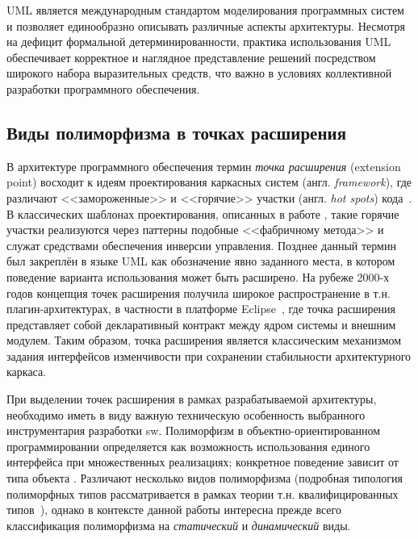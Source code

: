 UML является международным стандартом моделирования
программных систем и позволяет единообразно описывать различные
аспекты архитектуры. Несмотря на дефицит формальной
детерминированности, практика использования UML обеспечивает
корректное и наглядное представление решений посредством
широкого набора выразительных средств, что важно в условиях
коллективной разработки программного обеспечения.

\subsection{Виды полиморфизма в точках расширения}

В архитектуре программного обеспечения термин \emph{точка расширения}
(extension point) восходит к идеям проектирования каркасных систем (англ. \emph{framework}),
где различают <<замороженные>> и <<горячие>> участки (англ. \emph{hot spots}) кода~\cite{Pree1994-frameworks}. В классических шаблонах проектирования,
описанных в работе \cite{gof1994design-patterns}, такие горячие участки
реализуются через паттерны подобные <<фабричному метода>> и служат
средствами обеспечения инверсии управления. Позднее данный
термин был закреплён в языке UML как обозначение явно заданного места,
в котором поведение варианта использования может быть
расширено\cite{UML-1.5}. На рубеже 2000-х годов концепция точек расширения
получила широкое распространение в т.н. плагин-архитектурах, в
частности в платформе Eclipse~\cite{Eclipse-plugins}, где точка
расширения представляет собой декларативный контракт между ядром
системы и внешним модулем. Таким образом, точка расширения является
классическим механизмом задания интерфейсов изменчивости при
сохранении стабильности архитектурного каркаса.

При выделении точек расширения в рамках разрабатываемой архитектуры,
необходимо иметь в виду важную техническую особенность выбранного
инструментария разработки \acrshort{sw}. Полиморфизм
в объектно-ориентированном программировании
определяется как возможность использования единого интерфейса
при множественных реализациях; конкретное поведение зависит
от типа объекта \cite{CardelliWegner1985}. Различают несколько видов
полиморфизма (подробная типология полиморфных типов рассматривается
в рамках теории т.н. квалифицированных
типов~\cite{krieg1992esop-qualified-types-polymorphism}), однако
в контексте данной работы интересна прежде всего классификация
полиморфизма на \emph{статический} и \emph{динамический} виды.

